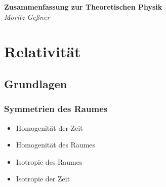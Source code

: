 \documentclass[11pt]{article}
\author{Moritz Geßner}
\numberwithin{equation}{section}
\begin{document}
  \newcommand{\xrowht}[2][0]
  {
    \addstackgap[.5\dimexpr#2\relax]{\vphantom{#1}}
  }
	\newcommand{\diff}
	{
		\mathrm{d}
	}
	\newcommand{\binomkoeff}[2]
	{
		\left(\begin{matrix}#1\\#2\end{matrix}\right)
	}
  \newcommand{\pvec}[1]
  {
    \vec{#1}\mkern2mu\vphantom{#1} %
  }
  \newcommand{\tder}[2] %
  {
    \frac{\diff #1}{\diff #2}
  }
  \newcommand{\pder}[2] %
  {
    \frac{\partial #1}{\partial #2}
  }
  \newcommand{\dpder}[2] %
  {
    \dfrac{\partial #1}{\partial #2}
  }
  \newcommand{\Nabla}
  {
    \vec{\nabla}
  }
  \newcommand{\unitvec}[1]
  {
    \vec{e}_{#1}
  }
  \newcommand{\com}[2]
  {
    \left[#1,#2\right]
  }
  \newcommand{\konst}
  {
    \mathrm{konst.}
  }
  \newcommand{\customEq}[1]
  {
    \stackrel{#1}{=}
  }
  \newcommand*{\rom}[1]
  {
    \uppercase\expandafter{\romannumeral #1\relax}
  }

  \newcommand{\br}[1] %
  {
    \left( #1 \right)
  }
  \newcommand{\cbr}[1] %
  {
    \left\lbrace #1 \right\rbrace
  }
  \newcommand{\rbr}[1] %
  {
    \left[ #1 \right]
  }
  \newcommand{\abr}[1] %
  {
    \left\langle #1 \right\rangle
  }
  \newcommand{\vbr}[1] %
  {
    \left| #1 \right|
  }


	\begin{center}
   	\Large\textbf{Zusammenfassung zur Theoretischen Physik} \\
		\large\textit{Moritz Geßner} \\
	\end{center}

	\tableofcontents
  \newpage

	\section{Relativität}
		\subsection{Grundlagen}
			\subsubsection{Symmetrien des Raumes}
        \begin{itemize}
          \item Homogenität der Zeit
          \item Homogenität des Raumes
          \item Isotropie des Raumes
          \item Isotropie der Zeit
        \end{itemize}
\end{document}
